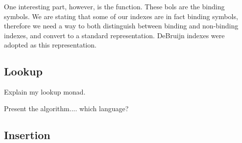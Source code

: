 
One interesting part, however, is the  function. These bols are the binding
symbols. We are stating that some of our indexes are in fact binding symbols, therefore
we need a way to both distinguish between binding and non-binding indexes, and convert
to a standard representation. DeBruijn indexes were adopted as this representation.

\subsection{Lookup}

\begin{TODO}
  \item Explain my lookup monad.
  \item Present the algorithm.... which language?
\end{TODO}

\subsection{Insertion}
